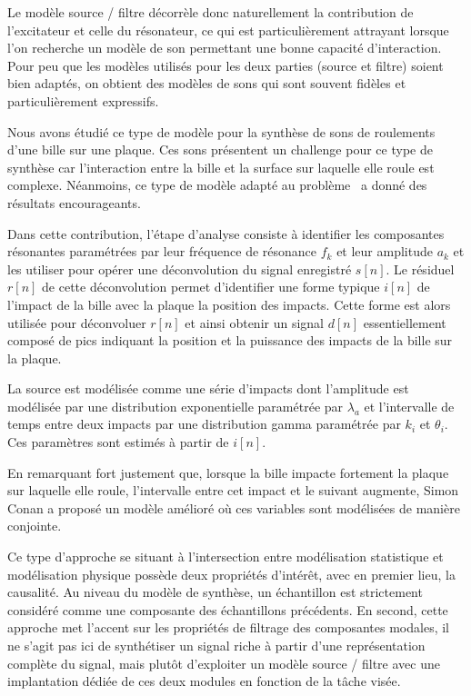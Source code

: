 Le modèle source / filtre décorrèle donc naturellement la contribution de l'excitateur et celle du résonateur, ce qui est particulièrement attrayant lorsque l'on recherche un modèle de son permettant une bonne capacité d'interaction. Pour peu que les modèles utilisés pour les deux parties (source et filtre) soient bien adaptés, on obtient des modèles de sons qui sont souvent fidèles et particulièrement expressifs.~\cite{aramaki2006analysis}

Nous avons étudié ce type de modèle pour la synthèse de sons de roulements d'une bille sur une plaque. Ces sons présentent un challenge pour ce type de synthèse car l'interaction entre la bille et la surface sur laquelle elle roule est complexe. Néanmoins, ce type de modèle adapté au problème~\cite{LagrangeTasslp10} a donné des résultats encourageants.~\cite{Murphy11a}

Dans cette contribution, l'étape d'analyse consiste à identifier les composantes résonantes paramétrées par leur fréquence de résonance $f_k$ et leur amplitude $a_k$ et les utiliser pour opérer une déconvolution du signal enregistré $s[n]$. Le résiduel $r[n]$ de cette déconvolution  permet d'identifier une forme typique $i[n]$ de l'impact de la bille avec la plaque la position des impacts. Cette forme est alors utilisée pour déconvoluer $r[n]$ et ainsi obtenir un signal $d[n]$ essentiellement composé de pics indiquant la position et la puissance des impacts de la bille sur la plaque.

La source est modélisée comme une série d'impacts dont l'amplitude est modélisée par une distribution exponentielle paramétrée par $\lambda_a$  et l'intervalle de temps entre deux impacts par une distribution gamma paramétrée par $k_i$ et $\theta_i$. Ces paramètres sont estimés à partir de $i[n]$.

En remarquant fort justement que, lorsque la bille impacte fortement la plaque sur laquelle elle roule, l'intervalle entre cet impact et le suivant augmente, Simon Conan a proposé un modèle amélioré où ces variables sont modélisées de manière conjointe.~\cite{conan2014synthesis}

Ce type d'approche se situant à l'intersection entre modélisation statistique et modélisation physique possède deux propriétés d'intérêt, avec en premier lieu, la causalité. Au niveau du modèle de synthèse, un échantillon est strictement considéré comme une composante des échantillons précédents. En second, cette approche met l'accent sur les propriétés de filtrage des composantes modales, il ne s'agit pas ici de synthétiser un signal riche à partir d'une représentation complète du signal, mais plutôt d'exploiter un modèle source / filtre avec une implantation dédiée de ces deux modules en fonction de la tâche visée.

